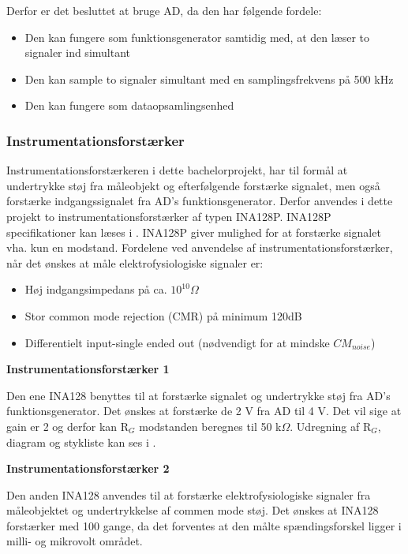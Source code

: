 Derfor er det besluttet at bruge AD, da den har følgende fordele:
\begin{itemize}
\item Den kan fungere som funktionsgenerator samtidig med, at den læser to signaler ind simultant
\item Den kan sample to signaler simultant med en samplingsfrekvens på 500 kHz
\item Den kan fungere som dataopsamlingsenhed
\end{itemize}



\subsubsection{Instrumentationsforstærker}

Instrumentationsforstærkeren i dette bachelorprojekt, har til formål at undertrykke støj fra måleobjekt og efterfølgende forstærke signalet, men også forstærke indgangssignalet fra AD's funktionsgenerator. Derfor anvendes i dette
projekt to instrumentationsforstærker af typen INA128P. INA128P specifikationer kan læses i . INA128P giver mulighed for at forstærke signalet vha. kun en modstand. Fordelene ved anvendelse af instrumentationsforstærker, når det ønskes at måle elektrofysiologiske signaler er\cite{PeterJohansen2014}:
\begin{itemize}
\item 	Høj indgangsimpedans på ca. $10^{10} \Omega $
\item	Stor common mode rejection (CMR) på minimum 120dB
\item 	Differentielt input-single ended out (nødvendigt for at mindske $CM_{noise}$)
\end{itemize}



\textbf{Instrumentationsforstærker 1}

Den ene INA128 benyttes til at forstærke signalet og undertrykke støj fra AD's funktionsgenerator. Det ønskes at forstærke de 2 V fra AD til 4 V. Det vil sige at gain er 2 og derfor kan R$_{G}$ modstanden beregnes til 50 k$\Omega$. Udregning af R$_{G}$, diagram og stykliste kan ses i .

\textbf{Instrumentationsforstærker 2}

Den anden INA128 anvendes til at forstærke elektrofysiologiske signaler fra måleobjektet og undertrykkelse af commen mode støj. Det ønskes at INA128 forstærker med 100 gange, da det forventes at den målte spændingsforskel ligger i milli- og mikrovolt området\cite{PeterJohansen2014}. 

